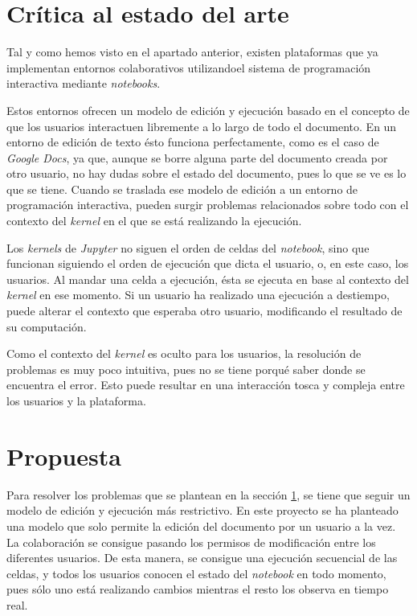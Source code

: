 \documentclass[11pt,spanish,listoffigures]{tfgetsinf}
\begin{document}

\section{Crítica al estado del arte}
\label{sec:critica-estado}

Tal y como hemos visto en el apartado anterior, existen plataformas que ya implementan entornos colaborativos utilizandoel sistema de programación interactiva mediante \textit{notebooks}. 

Estos entornos ofrecen un modelo de edición y ejecución basado en el concepto de que los usuarios interactuen libremente a lo largo de todo el documento. En un entorno de edición de texto ésto funciona perfectamente, como es el caso de \textit{Google Docs}, ya que, aunque se borre alguna parte del documento creada por otro usuario, no hay dudas sobre el estado del documento, pues lo que se ve es lo que se tiene. Cuando se traslada ese modelo de edición a un entorno de programación interactiva, pueden surgir problemas relacionados sobre todo con el contexto del \textit{kernel} en el que se está realizando la ejecución.

Los \textit{kernels} de \textit{Jupyter} no siguen el orden de celdas del \textit{notebook}, sino que funcionan siguiendo el orden de ejecución que dicta el usuario, o, en este caso, los usuarios. Al mandar una celda a ejecución, ésta se ejecuta en base al contexto del \textit{kernel} en ese momento. Si un usuario ha realizado una ejecución a destiempo, puede alterar el contexto que esperaba otro usuario, modificando el resultado de su computación. 

Como el contexto del \textit{kernel} es oculto para los usuarios, la resolución de problemas es muy poco intuitiva, pues no se tiene porqué saber donde se encuentra el error. Esto puede resultar en una interacción tosca y compleja entre los usuarios y la plataforma.



\section{Propuesta}
\label{sec:propuesta}

Para resolver los problemas que se plantean en la sección \ref{sec:critica-estado}, se tiene que seguir un modelo de edición y ejecución más restrictivo. En este proyecto se ha planteado una modelo que solo permite la edición del documento por un usuario a la vez. La colaboración se consigue pasando los permisos de modificación entre los diferentes usuarios. De esta manera, se consigue una ejecución secuencial de las celdas, y todos los usuarios conocen el estado del \textit{notebook} en todo momento, pues sólo uno está realizando cambios mientras el resto los observa en tiempo real.
\end{document}
